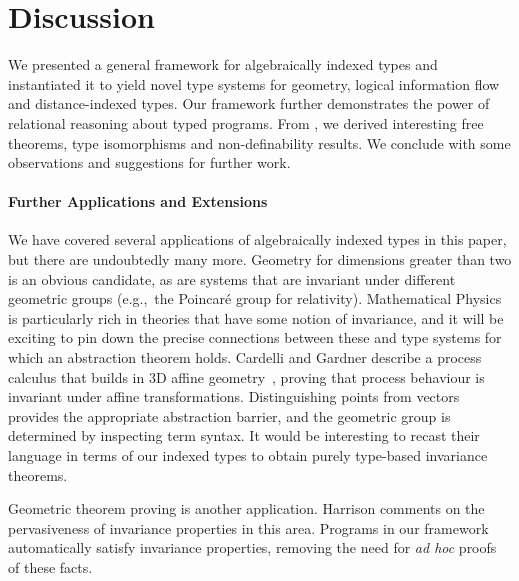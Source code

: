 \section{Discussion}
\label{sec:discussion}

We presented a general framework for algebraically indexed types and
instantiated it to yield novel type systems for geometry, logical
information flow and distance-indexed types. Our framework further
demonstrates the power of relational reasoning about typed
programs. From , we derived interesting free
theorems, type isomorphisms and non-definability results. We conclude
with some observations and suggestions for further work.

\paragraph{Further Applications and Extensions} We have covered
several applications of algebraically indexed types in this paper, but
there are undoubtedly many more. Geometry for dimensions greater than
two is an obvious candidate, as are systems that are invariant
under different geometric groups (e.g.,~the Poincar\'{e} group for
relativity). Mathematical Physics is particularly rich in theories
that have some notion of invariance, and it will be exciting to pin
down the precise connections between these and type systems for which
an abstraction theorem holds. 
Cardelli and Gardner describe a process calculus that builds in 3D affine geometry~\cite{Cardelli},
proving that process behaviour is invariant under affine transformations. Distinguishing points from vectors
provides the appropriate abstraction barrier, and the geometric group is determined by inspecting
term syntax. It would be interesting to recast their language in terms of our indexed types to
obtain purely type-based invariance theorems.

Geometric theorem
proving is another %
application. Harrison
\cite{harrison09without} comments on the pervasiveness of %
invariance properties in this area. Programs in our framework
automatically satisfy invariance properties, removing the need for
{\em ad hoc} proofs of these facts.



